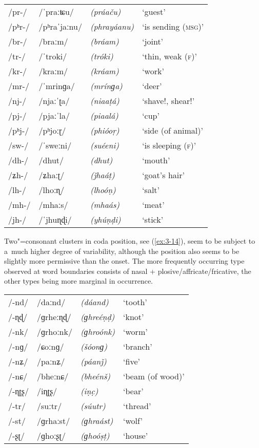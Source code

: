 \begin{exe}
\extab
\label{ex:3-13}
\begin{tabular}{ l l l l }
/pr-/ &
/ˈpraːʨu/ &
\textit{(práaču)} &
`guest'\\
/pʰr-/ &
/pʰraˈjaːnu/ &
\textit{(phrayáanu)} &
`is sending (\textsc{msg)}'\\
/br-/ &
/braːm/ &
\textit{(bráam)} &
`joint'\\
/tr-/ &
/ˈtroki/ &
\textit{(tróki)} &
`thin, weak (\textsc{f)}'\\
/kr-/ &
/kraːm/ &
\textit{(kráam)} &
`work' \\
/mr-/ &
/ˈmrinɡa/ &
\textit{(mrínɡa)} &
`deer'\\
/nj-/ &
/njaːˈʈa/ &
\textit{(niaaṭá)} &
`shave!, shear!' \\
/pj-/ &
/pjaːˈla/ &
\textit{(piaalá)} &
`cup'\\
/pʰj-/ &
/pʰjoːɽ/ &
\textit{(phióoṛ)} &
`side (of animal)' \\
/sw-/ &
/ˈsweːni/ &
\textit{(suéeni) } &
`is sleeping (\textsc{f)}'\\
/dh-/ &
/dhut/ &
\textit{(dhut)} &
`mouth'\\
/ʑh-/ &
/ʑhaːʈ/ &
\textit{(ǰhaáṭ)} &
`goat's hair'\\
/lh-/ &
/lhoːɳ/ &
\textit{(lhoóṇ) } &
`salt'\\
/mh-/ &
/mhaːs/ &
\textit{(mhaás)} &
`meat'\\
/jh-/ &
/ˈjhuɳɖi/ &
\textit{(yhúṇḍi)} &
`stick'\\
\end{tabular}
\end{exe}


Two"=consonant clusters in coda position, see (\ref{ex:3-14}), seem to be subject to a~much higher degree of variability, although the position also seems to be slightly more permissive than the onset. The more frequently occurring type observed at word boundaries consists of nasal + plosive/affricate/fricative, the other types being more marginal in occurrence. 


\begin{exe}
\extab
\label{ex:3-14}
\begin{tabular}{ l l l l }
/-nd/ &
/daːnd/ &
\textit{(dáand)} &
`tooth'\\
/-ɳɖ/ &
/ɡrheːɳɖ/ &
\textit{(ɡhreéṇḍ)} &
`knot'\\
/-nk/ &
/ɡrhoːnk/ &
\textit{(ɡhroónk)} &
`worm'\\
/-nɡ/ &
/ɕoːnɡ/ &
\textit{(šóonɡ) } &
`branch'\\
/-nʑ/ &
/paːnʑ/ &
\textit{(páanǰ) } &
`five' \\
/-nɕ/ &
/bheːnɕ/ &
\textit{(bheénš) } &
`beam (of wood)' \\
/-ɳʈʂ/ &
/iɳʈʂ/ &
\textit{(iṇc̣) } &
`bear' \\
/-tr/ &
/suːtr/ &
\textit{(súutr)} &
`thread' \\
/-st/ &
/ɡrhaːst/ &
\textit{(ɡhraást)} &
`wolf' \\
/-ʂʈ/ &
/ɡhoːʂʈ/ &
\textit{(ɡhoóṣṭ) } &
`house'\\
\end{tabular}
\end{exe}


